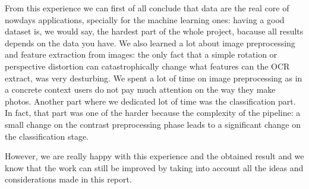 \documentclass[10pt,twocolumn,letterpaper]{article}
\begin{document}
From this experience we can first of all conclude that data are the
real core of nowdays applications, specially for the machine learning
ones: having a good dataset is, we would say, the hardest part of the
whole project, bacause all results depends on the data you have. We
also learned a lot about image preprocessing and feature extraction
from images: the only fact that a simple rotation or perspective
distortion can catastrophically change what features can the OCR
extract, was very desturbing. We spent a lot of time on image
preprocessing as in a concrete context users do not pay much attention
on the way they make photos. Another part where we dedicated lot of
time was the classification part. In fact, that part was one of the
harder because the complexity of the pipeline: a small change on the
contrast preprocessing phase leads to a significant change on the
classification stage.

However, we are really happy with this experience and the obtained
result and we know that the work can still be improved by taking into
account all the ideas and considerations made in this report.

{\small


}
\end{document}
